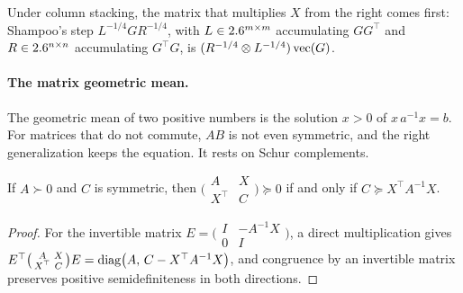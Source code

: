 \begin{refsection}
Under column stacking, the matrix that multiplies $X$ from the right comes first: Shampoo's step $L^{-1/4}GR^{-1/4}$, with $L\in2.6^{m\times m}$ accumulating $GG^\top$ and $R\in2.6^{n\times n}$ accumulating $G^\top G$, is $(R^{-1/4}\otimes L^{-1/4})\operatorname{vec}(G)$.

\paragraph{The matrix geometric mean.} The geometric mean of two positive numbers is the solution $x>0$ of $x\,a^{-1}x=b$. For matrices that do not commute, $AB$ is not even symmetric, and the right generalization keeps the equation. It rests on Schur complements.

\begin{lemma}\label{lem:toolkit:schur}
If $A\succ0$ and $C$ is symmetric, then $\bigl(\begin{smallmatrix}A&X\\X^\top&C\end{smallmatrix}\bigr)\succeq0$ if and only if $C\succeq X^\top A^{-1}X$.
\end{lemma}

\begin{proof}
For the invertible matrix $E=\bigl(\begin{smallmatrix}I&-A^{-1}X\\0&I\end{smallmatrix}\bigr)$, a direct multiplication gives $E^\top\bigl(\begin{smallmatrix}A&X\\X^\top&C\end{smallmatrix}\bigr)E=\operatorname{diag}\bigl(A,\,C-X^\top A^{-1}X\bigr)$, and congruence by an invertible matrix preserves positive semidefiniteness in both directions.
\end{proof}


\end{refsection}
